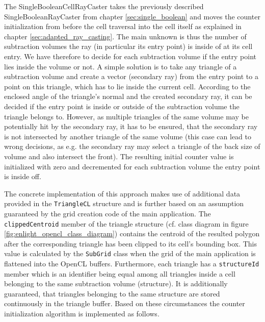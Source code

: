 The SingleBooleanCellRayCaster takes the previously described SingleBooleanRayCaster from chapter \ref{sec:single_boolean} and moves the counter initialization from before the cell traversal into the cell itself as explained in chapter \ref{sec:adapted_ray_casting}. The main unknown is thus the number of subtraction volumes the ray (in particular its entry point) is inside of at its cell entry. We have therefore to decide for each subtraction volume if the entry point lies inside the volume or not. A simple solution is to take any triangle of a subtraction volume and create a vector (secondary ray) from the entry point to a point on this triangle, which has to lie inside the current cell. According to the enclosed angle of the triangle's normal and the created secondary ray, it can be decided if the entry point is inside or outside of the subtraction volume the triangle belongs to. However, as multiple triangles of the same volume may be potentially hit by the secondary ray, it has to be ensured, that the secondary ray is not intersected by another triangle of the same volume (this case can lead to wrong decisions, as e.g. the secondary ray may select a triangle of the back size of volume and also intersect the front). The resulting initial counter value is initialized with zero and decremented for each subtraction volume the entry point is inside off.

The concrete implementation of this approach makes use of additional data provided in the \lstinline!TriangleCL! structure and is further based on an assumption guaranteed by the grid creation code of the main application. The \lstinline!clippedCentroid! member of the triangle structure (cf. class diagram in figure \ref{fig:enlight_opencl_class_diagram}) contains the centroid of the resulted polygon after the corresponding triangle has been clipped to its cell's bounding box. This value is calculated by the \lstinline!SubGrid! class when the grid of the main application is flattened into the OpenCL buffers. Furthermore, each triangle has a \lstinline!structureId! member which is an identifier being equal among all triangles inside a cell belonging to the same subtraction volume (structure). It is additionally guaranteed, that triangles belonging to the same structure are stored continuously in the triangle buffer. Based on these circumstances the counter initialization algorithm is implemented as follows.

